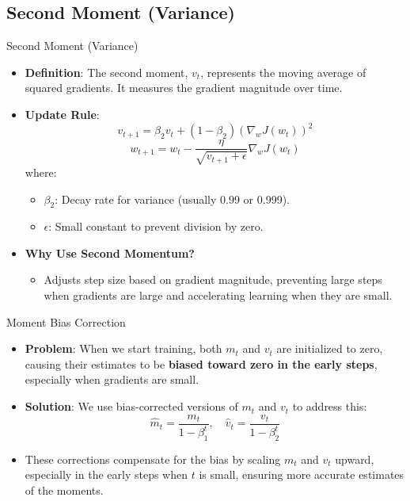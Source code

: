 \documentclass[serif, aspectratio=169]{beamer}
\begin{document}
\subsection{Second Moment (Variance)}
\begin{frame}{Second Moment (Variance)}
    \begin{itemize}
        \item \textbf{Definition}: The second moment, \( v_t \), represents the moving average of squared gradients. It measures the gradient magnitude over time.
        \item \textbf{Update Rule}:
        \[
        v_{t+1} = \beta_2 v_t + (1 - \beta_2) (\nabla_w J(w_t))^2
        \]
        \[
        w_{t+1} = w_t - \frac{\eta}{\sqrt{v_{t+1} + \epsilon}} \nabla_w J(w_t)
        \]
        where:
        \begin{itemize}
            \item \( \beta_2 \): Decay rate for variance (usually 0.99 or 0.999).
            \item \( \epsilon \): Small constant to prevent division by zero.
        \end{itemize}
        \item \textbf{Why Use Second Momentum?}
        \begin{itemize}
            \item Adjusts step size based on gradient magnitude, preventing large steps when gradients are large and accelerating learning when they are small.
        \end{itemize}
    \end{itemize}
\end{frame}

\begin{frame}{Moment Bias Correction}
    \begin{itemize}
        \item \textbf{Problem}: When we start training, both $m_{t}$ and $v_{t}$ are initialized to zero, causing their estimates to be \textbf{biased toward zero in the early steps}, especially when gradients are small.
        \item \textbf{Solution}: We use bias-corrected versions of $m_{t}$ and $v_{t}$ to address this:
        \[\hat{m}_{t} = \frac{m_{t}}{1 - \beta_1^{t}}, \quad 
        \hat{v}_{t} = \frac{v_{t}}{1 -\beta_2^{t}}\]
        \item These corrections compensate for the bias by scaling $m_{t}$ and $v_{t}$ upward, especially in the early steps when $t$ is small, ensuring more accurate estimates of the moments.
    \end{itemize}
\end{frame}
\end{document}
